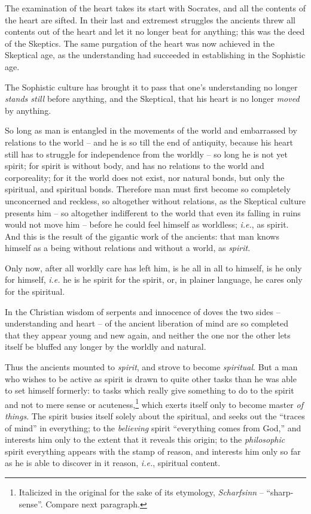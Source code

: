 The examination of the heart takes its start with Socrates, and all the 
contents of the heart are sifted. In their last and extremest struggles the 
ancients threw all contents out of the heart and let it no longer beat for 
anything; this was the deed of the Skeptics. The same purgation of the heart 
was now achieved in the Skeptical age, as the understanding had succeeded in 
establishing in the Sophistic age.

The Sophistic culture has brought it to pass that one's understanding no 
longer \textit{stands still} before anything, and the Skeptical, that his 
heart is no longer \textit{moved} by anything.

So long as man is entangled in the movements of the world and embarrassed by 
relations to the world -- and he is so till the end of antiquity, because his 
heart still has to struggle for independence from the worldly -- so long he is 
not yet spirit; for spirit is without body, and has no relations to the world 
and corporeality; for it the world does not exist, nor natural bonds, but only 
the spiritual, and spiritual bonds. Therefore man must first become so 
completely unconcerned and reckless, so altogether without relations, as the 
Skeptical culture presents him -- so altogether indifferent to the world that 
even its falling in ruins would not move him -- before he could feel himself 
as worldless; \textit{i.e.}, as spirit. And this is the result of the 
gigantic work of the ancients: that man knows himself as a being without 
relations and without a world, as \textit{spirit}.

Only now, after all worldly care has left him, is he all in all to himself, is 
he only for himself, \textit{i.e.} he is he spirit for the spirit, or, in 
plainer language, he cares only for the spiritual.

In the Christian wisdom of serpents and innocence of doves the two sides -- 
understanding and heart -- of the ancient liberation of mind are so completed 
that they appear young and new again, and neither the one nor the other lets 
itself be bluffed any longer by the worldly and natural.

Thus the ancients mounted to \textit{spirit}, and strove to become 
\textit{spiritual}. But a man who wishes to be active as spirit is drawn to 
quite other tasks than he was able to set himself formerly: to tasks which 
really give something to do to the spirit and not to mere sense or 
acuteness,\footnote{Italicized in the original for the sake of its etymology, 
\textit{Scharfsinn} -- ``sharp-sense''. Compare next paragraph.} which 
exerts itself only to become master \textit{of things}. The spirit busies 
itself solely about the spiritual, and seeks out the ``traces of mind'' in 
everything; to the \textit{believing} spirit ``everything comes from God,'' 
and interests him only to the extent that it reveals this origin; to the 
\textit{philosophic} spirit everything appears with the stamp of reason, and 
interests him only so far as he is able to discover in it reason, \textit{i.e.},
spiritual content.

